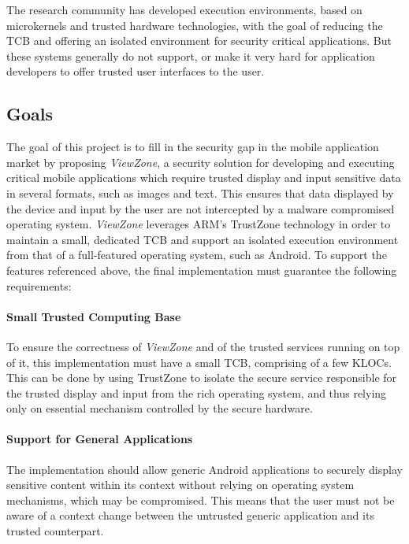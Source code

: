 The research community has developed execution environments, based on microkernels and trusted hardware technologies, with the goal of reducing the \ac{TCB} and offering an isolated environment for security critical applications. But these systems generally do not support, or make it very hard for application developers to offer trusted user interfaces to the user.

\subsection{Goals}
The goal of this project is to fill in the security gap in the mobile application market by proposing \emph{ViewZone}, a security solution for developing and executing critical mobile applications which require trusted display and input sensitive data in several formats, such as images and text. This ensures that data displayed by the device and input by the user are not intercepted by a malware compromised operating system. \emph{ViewZone} leverages ARM's TrustZone technology in order to maintain a small, dedicated \ac{TCB} and support an isolated execution environment from that of a full-featured operating system, such as Android.
To support the features referenced above, the final implementation must guarantee the following requirements:

\paragraph*{\textbf{Small Trusted Computing Base\\}} To ensure the correctness of \emph{ViewZone} and of the trusted services running on top of it, this implementation must have a small \ac{TCB}, comprising of a few KLOCs. This can be done by using TrustZone to isolate the secure service responsible for the trusted display and input from the rich operating system, and thus relying only on essential mechanism controlled by the secure hardware.

\paragraph*{\textbf{Support for General Applications\\}} The implementation should allow generic Android applications to securely display sensitive content within its context without relying on operating system mechanisms, which may be compromised. This means that the user must not be aware of a context change between the untrusted generic application and its trusted counterpart.

